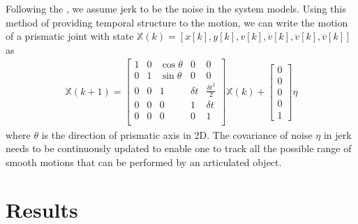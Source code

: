 \documentclass[conference]{IEEEtran}
\begin{document}
Following the  \cite{flash1985coordination}, we assume jerk to be the noise in the system models. Using this method of providing temporal structure to the motion, we can write the motion of a prismatic joint with state $\mathbb{X}(k) = [x[k],y[k],v[k],\dot{v}[k],\ddot{v}[k],\dddot{v}[k]]$ as 
\begin{align}
\mathbb{X}(k+1) = 
\begin{bmatrix}
1 & 0 & \cos{\theta} & 0 & 0\\
0 & 1 & \sin{\theta} & 0 & 0\\
0 & 0 & 1 & \delta t &\frac{{\delta  t}^2}{2}\\
0 & 0 & 0 & 1 &\delta t \\
0 & 0 & 0 & 0 &1 \\
\end{bmatrix} \mathbb{X}(k)+
\begin{bmatrix}
0\\
0\\
0\\
0\\
1
\end{bmatrix}\eta
\end{align}
where $\theta$ is the direction of prismatic axis in 2D. The covariance of noise $\eta$ in jerk needs to be continuously updated \cite{castella1980adaptive} to enable one to track all the possible range of smooth motions that can be performed by an articulated object.

\section{Results}
%  




\end{document}
